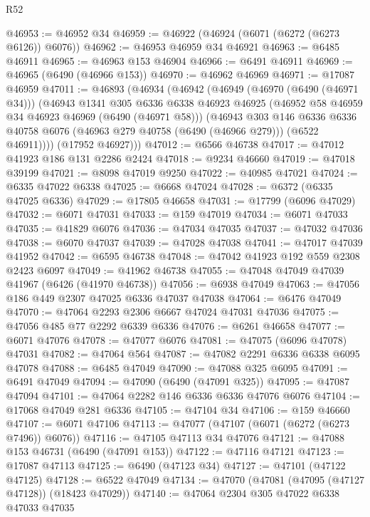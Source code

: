 \begin{lexlean}{R52}
\begin{coremodule}
@46953 := @46952 @34
@46959 := @46922 (@46924 (@6071 (@6272 (@6273 @6126)) @6076))
@46962 := @46953 @46959 @34 @46921
@46963 := @6485 @46911
@46965 := @46963 @153 @46904
@46966 := @6491 @46911
@46969 := @46965 (@6490 (@46966 @153))
@46970 := @46962 @46969
@46971 := @17087 @46959
@47011 := @46893
    (@46934
      (@46942
        (@46949
          (@46970 (@6490 (@46971 @34)))
          (@46943
            @1341
            @305
            @6336
            @6338
            @46923
            @46925
            (@46952 @58 @46959 @34 @46923 @46969 (@6490 (@46971 @58)))
            (@46943
              @303
              @146
              @6336
              @6336
              @40758
              @6076
              (@46963 @279 @40758 (@6490 (@46966 @279)))
              (@6522 @46911))))
        (@17952 @46927)))
@47012 := @6566 @46738
@47017 := @47012 @41923 @186 @131 @2286 @2424
@47018 := @9234 @46660
@47019 := @47018 @39199
@47021 := @8098 @47019 @9250
@47022 := @40985 @47021
@47024 := @6335 @47022 @6338
@47025 := @6668 @47024
@47028 := @6372 (@6335 @47025 @6336)
@47029 := @17805 @46658
@47031 := @17799 (@6096 @47029)
@47032 := @6071 @47031
@47033 := @159 @47019
@47034 := @6071 @47033
@47035 := @41829 @6076
@47036 := @47034 @47035
@47037 := @47032 @47036
@47038 := @6070 @47037
@47039 := @47028 @47038
@47041 := @47017 @47039 @41952
@47042 := @6595 @46738
@47048 := @47042 @41923 @192 @559 @2308 @2423 @6097
@47049 := @41962 @46738
@47055 := @47048 @47049 @47039 @41967 (@6426 (@41970 @46738))
@47056 := @6938 @47049
@47063 := @47056 @186 @449 @2307 @47025 @6336 @47037 @47038
@47064 := @6476 @47049
@47070 := @47064 @2293 @2306 @6667 @47024 @47031 @47036
@47075 := @47056 @485 @77 @2292 @6339 @6336
@47076 := @6261 @46658
@47077 := @6071 @47076
@47078 := @47077 @6076
@47081 := @47075 (@6096 @47078) @47031
@47082 := @47064 @564
@47087 := @47082 @2291 @6336 @6338 @6095 @47078
@47088 := @6485 @47049
@47090 := @47088 @325 @6095
@47091 := @6491 @47049
@47094 := @47090 (@6490 (@47091 @325))
@47095 := @47087 @47094
@47101 := @47064 @2282 @146 @6336 @6336 @47076 @6076
@47104 := @17068 @47049 @281 @6336
@47105 := @47104 @34
@47106 := @159 @46660
@47107 := @6071 @47106
@47113 := @47077 (@47107 (@6071 (@6272 (@6273 @7496)) @6076))
@47116 := @47105 @47113 @34 @47076
@47121 := @47088 @153 @46731 (@6490 (@47091 @153))
@47122 := @47116 @47121
@47123 := @17087 @47113
@47125 := @6490 (@47123 @34)
@47127 := @47101 (@47122 @47125)
@47128 := @6522 @47049
@47134 := @47070 (@47081 (@47095 (@47127 @47128)) (@18423 @47029))
@47140 := @47064 @2304 @305 @47022 @6338 @47033 @47035

\end{coremodule}
\end{lexlean}
